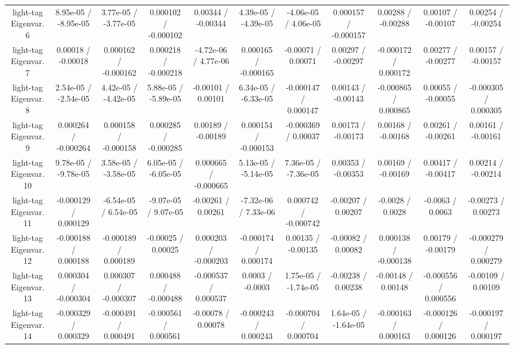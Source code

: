 {\begin{landscape}
\begin{longtable}{@{\extracolsep{\fill}}| *{11}{c|}}
  light-tag Eigenvar. 6 & 8.95e-05 / -8.95e-05 & 3.77e-05 / -3.77e-05 & 0.000102 / -0.000102 & 0.00344 / -0.00344 & 4.39e-05 / -4.39e-05 & -4.06e-05 / 4.06e-05 & 0.000157 / -0.000157 & 0.00288 / -0.00288 & 0.00107 / -0.00107 & 0.00254 / -0.00254 \\ 
  light-tag Eigenvar. 7 & 0.00018 / -0.00018 & 0.000162 / -0.000162 & 0.000218 / -0.000218 & -4.72e-06 / 4.77e-06 & 0.000165 / -0.000165 & -0.00071 / 0.00071 & 0.00297 / -0.00297 & -0.000172 / 0.000172 & 0.00277 / -0.00277 & 0.00157 / -0.00157 \\ 
  light-tag Eigenvar. 8 & 2.54e-05 / -2.54e-05 & 4.42e-05 / -4.42e-05 & 5.88e-05 / -5.89e-05 & -0.00101 / 0.00101 & 6.34e-05 / -6.33e-05 & -0.000147 / 0.000147 & 0.00143 / -0.00143 & -0.000865 / 0.000865 & 0.00055 / -0.00055 & -0.000305 / 0.000305 \\ 
  light-tag Eigenvar. 9 & 0.000264 / -0.000264 & 0.000158 / -0.000158 & 0.000285 / -0.000285 & 0.00189 / -0.00189 & 0.000154 / -0.000153 & -0.000369 / 0.00037 & 0.00173 / -0.00173 & 0.00168 / -0.00168 & 0.00261 / -0.00261 & 0.00161 / -0.00161 \\ 
  light-tag Eigenvar. 10 & 9.78e-05 / -9.78e-05 & 3.58e-05 / -3.58e-05 & 6.05e-05 / -6.05e-05 & 0.000665 / -0.000665 & 5.13e-05 / -5.14e-05 & 7.36e-05 / -7.36e-05 & 0.00353 / -0.00353 & 0.00169 / -0.00169 & 0.00417 / -0.00417 & 0.00214 / -0.00214 \\ 
  light-tag Eigenvar. 11 & -0.000129 / 0.000129 & -6.54e-05 / 6.54e-05 & -9.07e-05 / 9.07e-05 & -0.00261 / 0.00261 & -7.32e-06 / 7.33e-06 & 0.000742 / -0.000742 & -0.00207 / 0.00207 & -0.0028 / 0.0028 & -0.0063 / 0.0063 & -0.00273 / 0.00273 \\ 
  light-tag Eigenvar. 12 & -0.000188 / 0.000188 & -0.000189 / 0.000189 & -0.00025 / 0.00025 & 0.000203 / -0.000203 & -0.000174 / 0.000174 & 0.00135 / -0.00135 & -0.00082 / 0.00082 & 0.000138 / -0.000138 & 0.00179 / -0.00179 & -0.000279 / 0.000279 \\ 
  light-tag Eigenvar. 13 & 0.000304 / -0.000304 & 0.000307 / -0.000307 & 0.000488 / -0.000488 & -0.000537 / 0.000537 & 0.0003 / -0.0003 & 1.75e-05 / -1.74e-05 & -0.00238 / 0.00238 & -0.00148 / 0.00148 & -0.000556 / 0.000556 & -0.00109 / 0.00109 \\ 
  light-tag Eigenvar. 14 & -0.000329 / 0.000329 & -0.000491 / 0.000491 & -0.000561 / 0.000561 & -0.00078 / 0.00078 & -0.000243 / 0.000243 & -0.000704 / 0.000704 & 1.64e-05 / -1.64e-05 & -0.000163 / 0.000163 & -0.000126 / 0.000126 & -0.000197 / 0.000197 \\ 

\end{longtable}
\end{landscape}}

